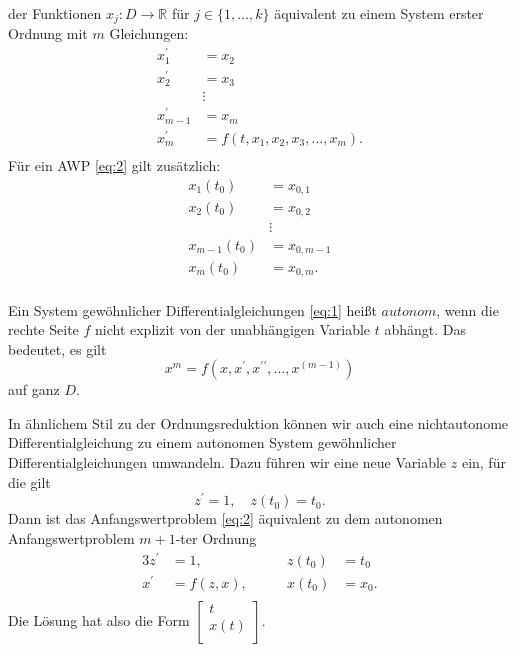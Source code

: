 der Funktionen $x_{j}:D \rightarrow \mathbb{R}$ für $j \in \{1,\dots,k\}$ äquivalent zu einem System erster Ordnung
mit $m$ Gleichungen:
\begin{align}
    x_{1}^{\prime}&=x_{2} \nonumber \\
    x_{2}^{\prime}&=x_{3} \nonumber \\
    &\vdots\\
    x_{m-1}^{\prime}&=x_{m} \nonumber \\
    x_{m}^{\prime}&=f(t, x_{1}, x_{2}, x_{3}, \ldots, x_{m}). \nonumber \\ \nonumber
\end{align}
Für ein AWP \eqref{eq:2} gilt zusätzlich:
\begin{align}
    x_{1}(t_{0})&=x_{0,1} \nonumber \\
    x_{2}(t_{0})&=x_{0,2} \nonumber \\
    &\vdots \\
    x_{m-1}(t_{0})&=x_{0,m-1} \nonumber \\
    x_{m}(t_{0})&=x_{0,m}. \nonumber \\ \nonumber
\end{align}
\begin{definition}
    Ein System gewöhnlicher Differentialgleichungen \eqref{eq:1} heißt $autonom$, wenn die rechte Seite $f$ nicht
    explizit von der unabhängigen Variable $t$ abhängt. Das bedeutet, es gilt
    \[
        x^{m} = f(x, x^{\prime}, x^{\prime\prime}, \dots, x^{(m-1)})
    \]
    auf ganz $D$.
\end{definition}
In ähnlichem Stil zu der Ordnungsreduktion können wir auch eine nichtautonome Differentialgleichung zu einem autonomen
System gewöhnlicher Differentialgleichungen umwandeln. Dazu führen wir eine neue Variable $z$ ein, für die gilt
\[
    z^{\prime} = 1, \quad z(t_0) = t_0.
\]
Dann ist das Anfangswertproblem \eqref{eq:2} äquivalent zu dem autonomen Anfangswertproblem $m+1$-ter Ordnung
\begin{alignat*}{3}
    z^{\prime} &= 1, \qquad &z(t_0) &= t_0 \\
    x^{\prime} &= f(z,x),\qquad  &x(t_0) &= x_0. \\
\end{alignat*}
Die Lösung hat also die Form $\left[ \begin{matrix}
                                         t\\
                                         x(t)\\
\end{matrix} \right].$


